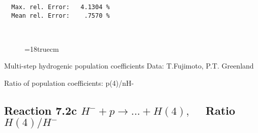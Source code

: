 \begin{verbatim}
  Max. rel. Error:   4.1304 %
  Mean rel. Error:    .7570 %



\end{verbatim}
\begin{figure} \label{7.2b}
\epsfxsize=18truecm
\end{figure}
\newpage

 Multi-step hydrogenic population coefficients
 Data: T.Fujimoto, P.T. Greenland

 Ratio of population coefficients: p(4)/nH-

\subsection{
Reaction 7.2c $ H^- + p \rightarrow ...+ H(4) , \quad $
Ratio $H(4)/H^- $
}

